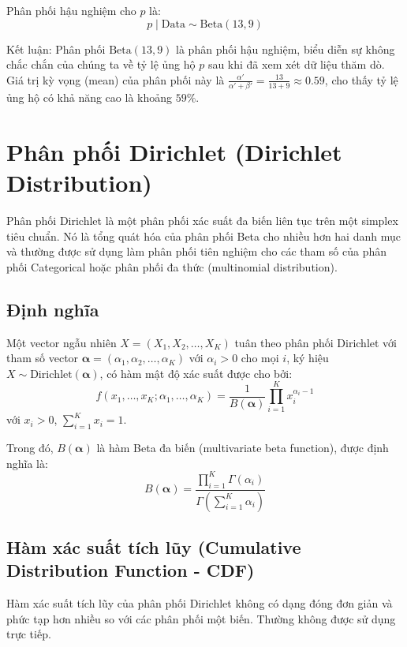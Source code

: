 Phân phối hậu nghiệm cho $p$ là:
\[
p \mid \text{Data} \sim \text{Beta}(13, 9)
\]

Kết luận: 
Phân phối $\text{Beta}(13, 9)$ là phân phối hậu nghiệm, 
biểu diễn sự không chắc chắn của chúng ta về tỷ lệ ủng hộ $p$ sau khi đã xem xét dữ liệu thăm dò. Giá trị kỳ vọng (mean) của phân phối này là $\frac{\alpha'}{\alpha' + \beta'} = \frac{13}{13+9} \approx 0.59$, cho thấy tỷ lệ ủng hộ có khả năng cao là khoảng $59\%$.
\section{Phân phối Dirichlet (Dirichlet Distribution)}
	Phân phối Dirichlet là một phân phối xác suất đa biến liên tục trên một simplex tiêu chuẩn. Nó là tổng quát hóa của phân phối Beta cho nhiều hơn hai danh mục và thường được sử dụng làm phân phối tiên nghiệm cho các tham số của phân phối Categorical hoặc phân phối đa thức (multinomial distribution).
	
	\subsection{Định nghĩa}
		Một vector ngẫu nhiên $X = (X_1, X_2, \dots, X_K)$ tuân theo phân phối Dirichlet với tham số vector $\boldsymbol{\alpha} = (\alpha_1, \alpha_2, \dots, \alpha_K)$ với $\alpha_i > 0$ cho mọi $i$, ký hiệu $X \sim \text{Dirichlet}(\boldsymbol{\alpha})$, có hàm mật độ xác suất được cho bởi:
		\[ f(x_1, \dots, x_K; \alpha_1, \dots, \alpha_K) = \frac{1}{B(\boldsymbol{\alpha})} \prod_{i=1}^K x_i^{\alpha_i-1} \]
		với $x_i > 0$, $\sum_{i=1}^K x_i = 1$.
		
		Trong đó, $B(\boldsymbol{\alpha})$ là hàm Beta đa biến (multivariate beta function), được định nghĩa là:
		\[ B(\boldsymbol{\alpha}) = \frac{\prod_{i=1}^K \Gamma(\alpha_i)}{\Gamma\left(\sum_{i=1}^K \alpha_i\right)} \]
	
	\subsection{Hàm xác suất tích lũy (Cumulative Distribution Function - CDF)}
	Hàm xác suất tích lũy của phân phối Dirichlet không có dạng đóng đơn giản và phức tạp hơn nhiều so với các phân phối một biến. Thường không được sử dụng trực tiếp.
	
